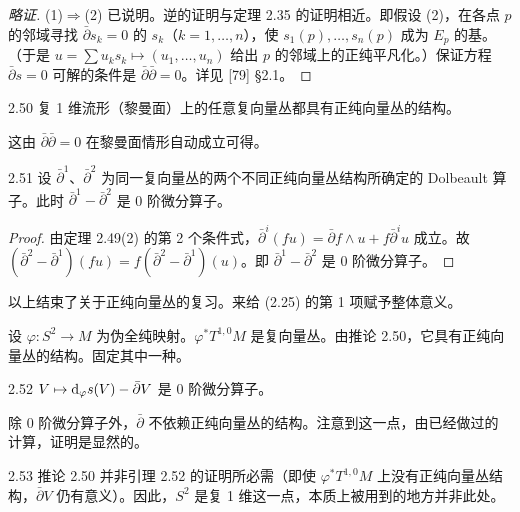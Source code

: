 \begin{proof}[略证]
  (1)$\Rightarrow$(2) 已说明。逆的证明与定理 2.35 的证明相近。即假设 (2)，在各点 $p$ 的邻域寻找 $\bar\partial s_k=0$ 的 $s_k$（$k=1,\dots,n$），使 $s_1(p),\dots,s_n(p)$ 成为 $E_p$ 的基。（于是 $u=\sum u_ks_k\mapsto(u_1,\dots,u_n)$ 给出 $p$ 的邻域上的正纯平凡化。）保证方程 $\bar\partial s=0$ 可解的条件是 $\bar\partial\bar\partial=0$。详见 [79] §2.1。
\end{proof}

\begin{corollary}{2.50}
  复 1 维流形（黎曼面）上的任意复向量丛都具有正纯向量丛的结构。
\end{corollary}

这由 $\bar\partial\bar\partial=0$ 在黎曼面情形自动成立可得。

\begin{lemma*}{2.51}
  设 $\bar\partial^1$、$\bar\partial^2$ 为同一复向量丛的两个不同正纯向量丛结构所确定的 Dolbeault 算子。此时 $\bar\partial^1-\bar\partial^2$ 是 0 阶微分算子。
\end{lemma*}

\begin{proof}
  由定理 2.49(2) 的第 2 个条件式，$\bar\partial^i(fu)=\bar\partial f\wedge u+f\bar\partial^iu$ 成立。故 $(\bar\partial^2-\bar\partial^1)(fu)=f(\bar\partial^2-\bar\partial^1)(u)$。即 $\bar\partial^1-\bar\partial^2$ 是 0 阶微分算子。
\end{proof}

以上结束了关于正纯向量丛的复习。来给 (2.25) 的第 1 项赋予整体意义。

设 $\varphi\colon S^2\to M$ 为伪全纯映射。$\varphi^*T^{1,0}M$ 是复向量丛。由推论 2.50，它具有正纯向量丛的结构。固定其中一种。

\begin{lemma}{2.52}
  $V\mapsto\mathrm{d}_\varphi s(V)-\bar\partial V$ 是 0 阶微分算子。
\end{lemma}

除 0 阶微分算子外，$\bar\partial$ 不依赖正纯向量丛的结构。注意到这一点，由已经做过的计算，证明是显然的。

\begin{remark}{2.53}
  推论 2.50 并非引理 2.52 的证明所必需（即使 $\varphi^*T^{1,0}M$ 上没有正纯向量丛结构，$\bar\partial V$ 仍有意义）。因此，$S^2$ 是复 1 维这一点，本质上被用到的地方并非此处。
\end{remark}

